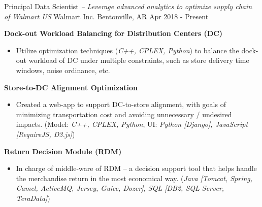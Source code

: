 

\begin{cventries}


\cventry
{Principal Data Scientist \textit{ -- Leverage advanced analytics to optimize supply chain of Walmart US}}          %
{Walmart Inc.}                      %
{Bentonville, AR}                   %
{Apr 2018 - Present}                    %
{
    \begin{cvitems}
    \item {
        \textbf{Dock-out Workload Balancing for Distribution Centers (DC)}  
        \begin{itemize}
            \item  Utilize optimization techniques (\textit{C++, CPLEX, Python}) to balance the dock-out workload of DC under multiple constraints, such as store delivery time windows, noise ordinance, etc. 
        \end{itemize}           
    }
    \item {
        \textbf{Store-to-DC Alignment Optimization} 
        \begin{itemize}
            \item  Created a web-app to support DC-to-store alignment, with goals of minimizing transportation cost and avoiding unnecessary / undesired impacts. 
            (Model: \textit{C++, CPLEX, Python}, UI: \textit{Python [Django], JavaScript [RequireJS, D3.js]}) 
        \end{itemize}           
    }
    \item {
        \textbf{Return Decision Module (RDM)} 
        \begin{itemize}
            \item  In charge of middle-ware of RDM -- a decision support tool that helps handle the merchandise return in the most economical way. 
                   (\textit{Java [Tomcat, Spring, Camel, ActiveMQ, Jersey, Guice, Dozer], SQL [DB2, SQL Server, TeraData]})
        \end{itemize}           
    }
    \end{cvitems}%
}


\end{cventries}

